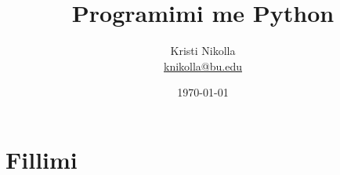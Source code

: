 \documentclass{book}
\title{Programimi me Python}
\author{Kristi Nikolla \\ \url{knikolla@bu.edu}}
\date{\today}
\begin{document}
\maketitle

\tableofcontents
\newpage

\part{Fillimi}

\end{document}
